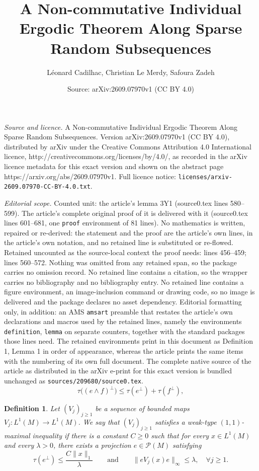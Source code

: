 \documentclass[10pt,a4paper]{amsart}
\title{A Non-commutative Individual Ergodic Theorem Along Sparse Random Subsequences}
\author{L\'eonard Cadilhac, Christian Le Merdy, Safoura Zadeh}
\date{Source: arXiv:2609.07970v1 (CC BY 4.0)}
\newtheorem{definition}{Definition}
\renewcommand{\P}{\mbox{${\mathcal P}$}}
\begin{document}
\maketitle

\noindent\emph{Source and licence.} A Non-commutative Individual Ergodic Theorem Along Sparse Random Subsequences. Version arXiv:2609.07970v1 (CC BY 4.0), distributed by arXiv under the Creative Commons Attribution 4.0 International licence, http://creativecommons.org/licenses/by/4.0/, as recorded in the arXiv licence metadata for this exact version and shown on the abstract page https://arxiv.org/abs/2609.07970v1. Full licence notice: \texttt{licenses/arxiv-2609.07970-CC-BY-4.0.txt}.\par\smallskip

\noindent\textit{Editorial scope.} Counted unit: the article's lemma 3Y1 (source0.tex lines 580--599). The article's complete original proof of it is delivered with it (source0.tex lines 601--681, one \texttt{proof} environment of 81 lines). No mathematics is written, repaired or re-derived: the statement and the proof are the article's own lines, in the article's own notation, and no retained line is substituted or re-flowed.  Retained uncounted as the source-local context the proof needs: lines 456--459; lines 560--572.  Nothing was omitted from any retained span, so the package carries no omission record.  No retained line contains a citation, so the wrapper carries no bibliography and no bibliography entry.  No retained line contains a figure environment, an image-inclusion command or drawing code, so no image is delivered and the package declares no asset dependency.  Editorial formatting only, in addition: an AMS \texttt{amsart} preamble that restates the article's own declarations and macros used by the retained lines, namely the environments \texttt{definition}, \texttt{lemma} on separate counters, together with the standard packages those lines need.  The retained environments print in this document as Definition 1, Lemma 1 in order of appearance, whereas the article prints the same items with the numbering of its own full document.  The complete native source of the article as distributed in the arXiv e-print for this exact version is bundled unchanged as \texttt{sources/209680/source0.tex}.
\begin{equation}\label{2Tr}
\tau\bigl((e\wedge f)^\perp\bigr)
\leq \tau(e^\perp)+\tau(f^\perp),
\end{equation}

\begin{definition}\label{3MI}
Let \((V_j)_{j\ge1}\) be a sequence of bounded 
maps \(V_j : L^1(M) \longrightarrow L^1(M)\).
We say that \((V_j)_{j\ge1}\) satisfies a weak-type
$(1,1)$-maximal inequality if there is a constant \(C\geq 0\) 
such that for every \(x\in L^1(M)\) and every \(\lambda>0\), 
there exists a projection \(e\in \P(M)\) satisfying
\begin{equation}\label{3Weak11}
\tau(e^\perp)\le \frac{C\|x\|_1}{\lambda}
\qquad\text{and}\qquad
\|eV_j(x)e\|_\infty \le \lambda, \quad \forall j\ge1.
\end{equation}
\end{definition}
\end{document}

